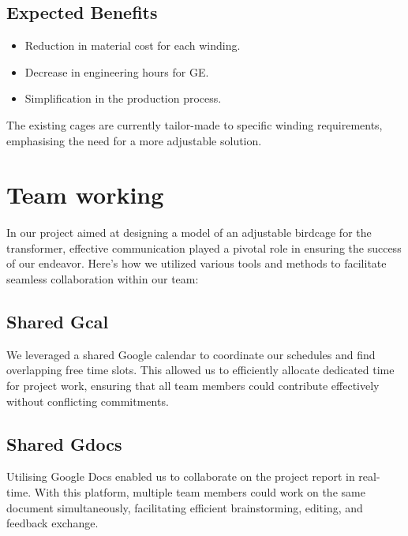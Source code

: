 \documentclass[a4paper,10pt]{article}
\begin{document}
\subsection{Expected Benefits}
\begin{itemize}
  \item Reduction in material cost for each winding.
  \item Decrease in engineering hours for \gls{GE}.
  \item Simplification in the production process.
\end{itemize}

The existing cages are currently tailor-made to specific winding requirements, emphasising the need for a more adjustable solution.



\section{Team working}
In our project aimed at designing a model of an adjustable birdcage for the transformer, effective communication played a pivotal role in ensuring the success of our endeavor. Here's how we utilized various tools and methods to facilitate seamless collaboration within our team:

\subsection{Shared Gcal}
We leveraged a shared Google calendar to coordinate our schedules and find overlapping free time slots. This allowed us to efficiently allocate dedicated time for project work, ensuring that all team members could contribute effectively without conflicting commitments.

\subsection{Shared Gdocs}
Utilising Google Docs enabled us to collaborate on the project report in real-time. With this platform, multiple team members could work on the same document simultaneously, facilitating efficient brainstorming, editing, and feedback exchange.
\end{document}
